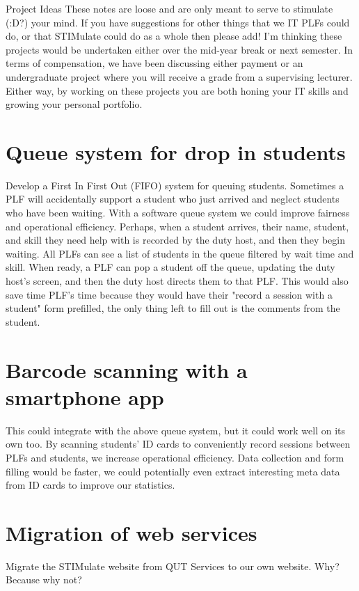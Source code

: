 \documentclass[]{article}
\begin{document}
Project Ideas
These notes are loose and are only meant to serve to stimulate (:D?) your mind. If you have suggestions for other things that we IT PLFs could do, or that STIMulate could do as a whole then please add! I’m thinking these projects would be undertaken either over the mid-year break or next semester. In terms of compensation, we have been discussing either payment or an undergraduate project where you will receive a grade from a supervising lecturer. Either way, by working on these projects you are both honing your IT skills and growing your personal portfolio.

\section{Queue system for drop in students}
Develop a First In First Out (FIFO) system for queuing students. Sometimes a PLF will accidentally support a student who just arrived and neglect students who have been waiting. With a software queue system we could improve fairness and operational efficiency. Perhaps, when a student arrives, their name, student, and skill they need help with is recorded by the duty host, and then they begin waiting. All PLFs can see a list of students in the queue filtered by wait time and skill. When ready, a PLF can pop a student off the queue, updating the duty host's screen, and then the duty host directs them to that PLF. This would also save time PLF's time because they would have their "record a session with a student" form prefilled, the only thing left to fill out is the comments from the student. 

\section{Barcode scanning with a smartphone app}
This could integrate with the above queue system, but it could work well on its own too. By scanning students’ ID cards to conveniently record sessions between PLFs and students, we increase operational efficiency. Data collection and form filling would be faster, we could potentially even extract interesting meta data from ID cards to improve our statistics. 

\section{Migration of web services}
Migrate the STIMulate website from QUT Services to our own website. Why? Because why not?
\end{document}

